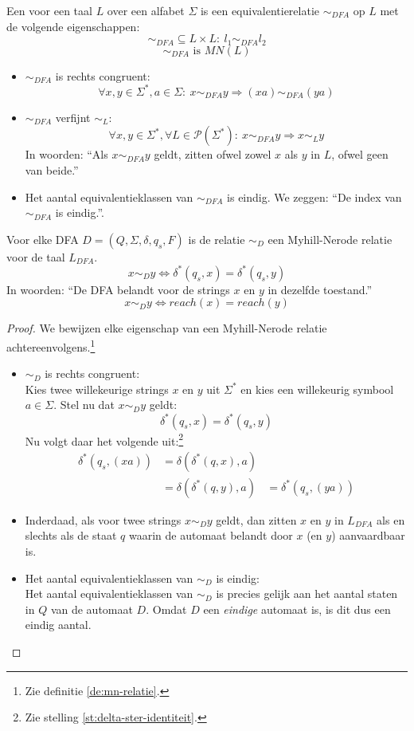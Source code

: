 \documentclass[main.tex]{subfiles}
\begin{document}
\begin{de}
  \label{de:mn-relatie}
  Een  voor een taal $L$ over een alfabet $\Sigma$ is een equivalentierelatie $\sim_{DFA}$ op $L$ met de volgende eigenschappen:
  \[ \sim_{DFA} \subseteq L \times L:\ l_{1} \sim_{DFA} l_{2}\]
  \[ \sim_{DFA} \text{ is } MN(L) \]
  \begin{itemize}
  \item $\sim_{DFA}$ is rechts congruent:
    \[ \forall x,y \in \Sigma^{*}, a \in \Sigma:\ x \sim_{DFA} y \Rightarrow (xa) \sim_{DFA} (ya) \]
  \item $\sim_{DFA}$ verfijnt $\sim_{L}$:
    \[ \forall x,y \in \Sigma^{*}, \forall L\in \mathcal{P}(\Sigma^{*}):\ x \sim_{DFA} y \Rightarrow x \sim_{L} y\]
    In woorden: ``Als $x \sim_{DFA} y$ geldt, zitten ofwel zowel $x$ als $y$ in $L$, ofwel geen van beide.''
  \item Het aantal equivalentieklassen van $\sim_{DFA}$ is eindig.
    We zeggen: ``De index van $\sim_{DFA}$ is eindig.''.
  \end{itemize}
\end{de}

\begin{st}
  Voor elke DFA $D = (Q,\Sigma,\delta,q_{s},F)$ is de relatie $\sim_{D}$ een Myhill-Nerode relatie voor de taal $L_{DFA}$.
  \[ x \sim_{D} y \Leftrightarrow \delta^{*}(q_{s},x) = \delta^{*}(q_{s},y) \]
  In woorden: ``De DFA belandt voor de strings $x$ en $y$ in dezelfde toestand.''
  \[ x \sim_{D} y \Leftrightarrow reach(x) = reach(y) \]
  \begin{proof}
    We bewijzen elke eigenschap van een Myhill-Nerode relatie achtereenvolgens.\footnote{Zie definitie \ref{de:mn-relatie}.}
    \begin{itemize}
    \item $\sim_{D}$ is rechts congruent:\\
      Kies twee willekeurige strings $x$ en $y$ uit $\Sigma^{*}$ en kies een willekeurig symbool $a\in \Sigma$.
      Stel nu dat $x \sim_{D} y$ geldt:
      \[ \delta^{*}(q_{s},x) = \delta^{*}(q_{s},y) \]
      Nu volgt daar het volgende uit:\footnote{Zie stelling \ref{st:delta-ster-identiteit}.}
      \[
      \begin{array}{rll}
        \delta^{*}(q_{s},(xa)) &= \delta(\delta^{*}(q,x),a) &\\
                               &= \delta(\delta^{*}(q,y),a) &= \delta^{*}(q_{s},(ya))
      \end{array}
      \]
    \item Inderdaad, als voor twee strings $x \sim_{D} y$ geldt, dan zitten $x$ en $y$ in $L_{DFA}$ als en slechts als de staat $q$ waarin de automaat belandt door $x$ (en $y$) aanvaardbaar is.
    \item Het aantal equivalentieklassen van $\sim_{D}$ is eindig:\\
      Het aantal equivalentieklassen van $\sim_{D}$ is precies gelijk aan het aantal staten in $Q$ van de automaat $D$. Omdat $D$ een \emph{eindige} automaat is, is dit dus een eindig aantal.
    \end{itemize}
  \end{proof}
\end{st}
\end{document}
